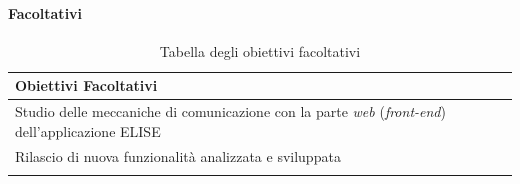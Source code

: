 
	\paragraph{Facoltativi}

		\begin{center}
		  \bgroup
		  \def\arraystretch{1.4}
		   \setlength\arrayrulewidth{0.6pt}
		   \begin{longtable}{ | p{11cm} |} \hline
		   
		    \cellcolor[gray]{0.9} \textbf{Obiettivi Facoltativi} \\ \hline

			Studio delle meccaniche di comunicazione con la parte \textit{web} (\textit{front-end}) dell'applicazione ELISE \\ \hline
			Rilascio di nuova funzionalità analizzata e sviluppata \\ \hline

			
			\caption{Tabella degli obiettivi facoltativi}
			
		    \end{longtable}
		  \egroup
		\end{center}	
	

